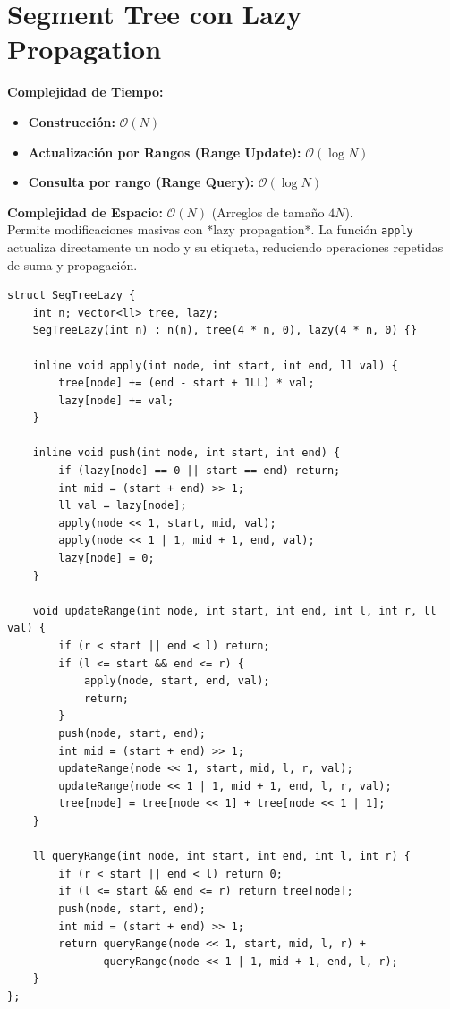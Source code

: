 \documentclass[10pt,twocolumn,letterpaper]{report}
\begin{document}
\section{Segment Tree con Lazy Propagation}
\textbf{Complejidad de Tiempo:}
\begin{itemize}
    \item \textbf{Construcción:} $\mathcal{O}(N)$
    \item \textbf{Actualización por Rangos (Range Update):} $\mathcal{O}(\log N)$
    \item \textbf{Consulta por rango (Range Query):} $\mathcal{O}(\log N)$
\end{itemize}
\textbf{Complejidad de Espacio:} $\mathcal{O}(N)$ (Arreglos de tamaño $4N$). \\
Permite modificaciones masivas con *lazy propagation*. La función \texttt{apply} actualiza directamente un nodo y su etiqueta, reduciendo operaciones repetidas de suma y propagación.
\begin{lstlisting}
struct SegTreeLazy {
    int n; vector<ll> tree, lazy;
    SegTreeLazy(int n) : n(n), tree(4 * n, 0), lazy(4 * n, 0) {}

    inline void apply(int node, int start, int end, ll val) {
        tree[node] += (end - start + 1LL) * val;
        lazy[node] += val;
    }

    inline void push(int node, int start, int end) {
        if (lazy[node] == 0 || start == end) return;
        int mid = (start + end) >> 1;
        ll val = lazy[node];
        apply(node << 1, start, mid, val);
        apply(node << 1 | 1, mid + 1, end, val);
        lazy[node] = 0;
    }

    void updateRange(int node, int start, int end, int l, int r, ll val) {
        if (r < start || end < l) return;
        if (l <= start && end <= r) {
            apply(node, start, end, val);
            return;
        }
        push(node, start, end);
        int mid = (start + end) >> 1;
        updateRange(node << 1, start, mid, l, r, val);
        updateRange(node << 1 | 1, mid + 1, end, l, r, val);
        tree[node] = tree[node << 1] + tree[node << 1 | 1];
    }

    ll queryRange(int node, int start, int end, int l, int r) {
        if (r < start || end < l) return 0;
        if (l <= start && end <= r) return tree[node];
        push(node, start, end);
        int mid = (start + end) >> 1;
        return queryRange(node << 1, start, mid, l, r) +
               queryRange(node << 1 | 1, mid + 1, end, l, r);
    }
};
\end{lstlisting}
\end{document}
